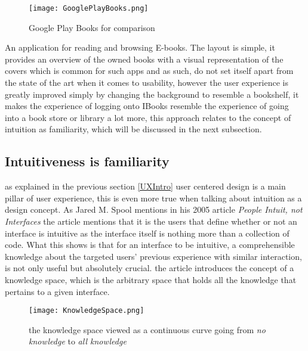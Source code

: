 \begin{figure}[H]
\centering
\texttt{[image: GooglePlayBooks.png]}
\caption{Google Play Books for comparison}
\end{figure}
An application for reading and browsing E-books. The layout is simple, it provides an overview of the owned books with a visual representation of the covers which is common for such apps and as such, do not set itself apart from the state of the art when it comes to usability, however the user experience is greatly improved simply by changing the background to resemble a bookshelf, it makes the experience of logging onto IBooks resemble the experience of going into a book store or library a lot more, this approach relates to the concept of intuition as familiarity, which will be discussed in the next subsection.   



\subsection{Intuitiveness is familiarity}
as explained in the previous section \ref{UXIntro} user centered design is a main pillar of user experience, this is even more true when talking about intuition as a design concept. As Jared M. Spool mentions in his 2005 article \textit{People Intuit, not Interfaces}\cite{JaredMSpool} the article mentions that it is the users that define whether or not an interface is intuitive as the interface itself is nothing more than a collection of code. What this shows is that for an interface to be intuitive, a comprehensible knowledge about the targeted users' previous experience with similar interaction, is not only useful but absolutely crucial. the article introduces the concept of a knowledge space, which is the arbitrary space that holds all the knowledge that pertains to a given interface. 

\begin{figure}[H]
\centering
\texttt{[image: KnowledgeSpace.png]}
\caption{the knowledge space viewed as a continuous curve going from \textit{no knowledge} to \textit{all knowledge} \cite{JaredMSpool}}
\label{fig:Knowledge}
\end{figure}

